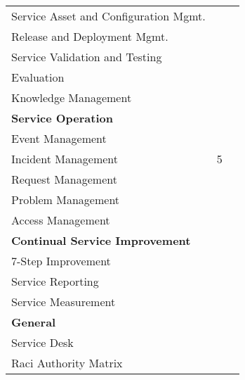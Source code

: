 \begin{table}[h!]
\begin{tabular}{|p{6.1cm}|p{4.5cm}|p{4.5cm}|}
Service Asset and Configuration Mgmt.                   &                                &\\
Release and Deployment Mgmt.                   &                                &\\
Service Validation and Testing                   &                                &\\
Evaluation                   &                                &\\
Knowledge Management                   &                                &\\\hline
\textbf{Service Operation}          &                                &\\
Event Management                   &                                &\\
Incident Management                   &        5                        &\\
Request Management                   &                                &\\
Problem Management                   &                                &\\
Access Management                   &                                &\\\hline
\textbf{Continual Service Improvement}          &                                &\\
7-Step Improvement                   &                                &\\
Service Reporting                   &                                &\\
Service Measurement                 &                                &\\\hline
\textbf{General}                   &                                 &\\
Service Desk                       &                                 &\\
Raci Authority Matrix                    &                           &\\\hline
\end{tabular}
\label{tab:SupportedITSMProcesses}
\end{table}
